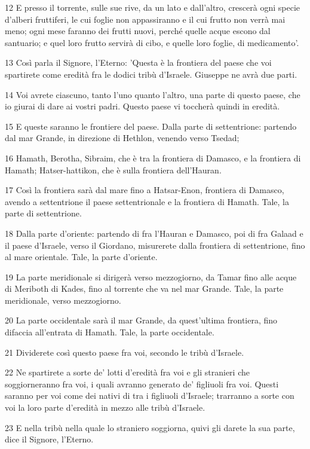\par 12 E presso il torrente, sulle sue rive, da un lato e dall'altro, crescerà ogni specie d'alberi fruttiferi, le cui foglie non appassiranno e il cui frutto non verrà mai meno; ogni mese faranno dei frutti nuovi, perché quelle acque escono dal santuario; e quel loro frutto servirà di cibo, e quelle loro foglie, di medicamento'.
\par 13 Così parla il Signore, l'Eterno: 'Questa è la frontiera del paese che voi spartirete come eredità fra le dodici tribù d'Israele. Giuseppe ne avrà due parti.
\par 14 Voi avrete ciascuno, tanto l'uno quanto l'altro, una parte di questo paese, che io giurai di dare ai vostri padri. Questo paese vi toccherà quindi in eredità.
\par 15 E queste saranno le frontiere del paese. Dalla parte di settentrione: partendo dal mar Grande, in direzione di Hethlon, venendo verso Tsedad;
\par 16 Hamath, Berotha, Sibraim, che è tra la frontiera di Damasco, e la frontiera di Hamath; Hatser-hattikon, che è sulla frontiera dell'Hauran.
\par 17 Così la frontiera sarà dal mare fino a Hatsar-Enon, frontiera di Damasco, avendo a settentrione il paese settentrionale e la frontiera di Hamath. Tale, la parte di settentrione.
\par 18 Dalla parte d'oriente: partendo di fra l'Hauran e Damasco, poi di fra Galaad e il paese d'Israele, verso il Giordano, misurerete dalla frontiera di settentrione, fino al mare orientale. Tale, la parte d'oriente.
\par 19 La parte meridionale si dirigerà verso mezzogiorno, da Tamar fino alle acque di Meriboth di Kades, fino al torrente che va nel mar Grande. Tale, la parte meridionale, verso mezzogiorno.
\par 20 La parte occidentale sarà il mar Grande, da quest'ultima frontiera, fino difaccia all'entrata di Hamath. Tale, la parte occidentale.
\par 21 Dividerete così questo paese fra voi, secondo le tribù d'Israele.
\par 22 Ne spartirete a sorte de' lotti d'eredità fra voi e gli stranieri che soggiorneranno fra voi, i quali avranno generato de' figliuoli fra voi. Questi saranno per voi come dei nativi di tra i figliuoli d'Israele; trarranno a sorte con voi la loro parte d'eredità in mezzo alle tribù d'Israele.
\par 23 E nella tribù nella quale lo straniero soggiorna, quivi gli darete la sua parte, dice il Signore, l'Eterno.

